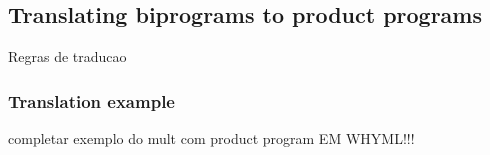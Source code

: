 \FloatBarrier
\subsection{Translating biprograms to product programs}
\label{subsec:whyrel_translation}
Regras de traducao




\subsubsection{Translation example}
\label{subsubsec:whyrel_translation_example}
completar exemplo do mult com product program EM WHYML!!!

